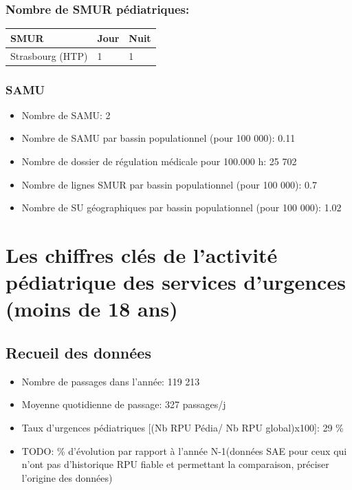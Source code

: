 \documentclass[]{article}
\begin{document}
\subsubsection{Nombre de SMUR
pédiatriques:}\label{nombre-de-smur-pediatriques}

\begin{longtable}[c]{@{}lll@{}}
\toprule
SMUR & Jour & Nuit\tabularnewline
\midrule
\endhead
Strasbourg (HTP) & 1 & 1\tabularnewline
\bottomrule
\end{longtable}

\subsubsection{SAMU}\label{samu}

\begin{itemize}
\itemsep1pt\parskip0pt
\item
  Nombre de SAMU: 2
\item
  Nombre de SAMU par bassin populationnel (pour 100 000): 0.11
\item
  Nombre de dossier de régulation médicale pour 100.000 h: 25 702
\item
  Nombre de lignes SMUR par bassin populationnel (pour 100 000): 0.7
\item
  Nombre de SU géographiques par bassin populationnel (pour 100 000):
  1.02
\end{itemize}

\section{Les chiffres clés de l'activité pédiatrique des services
d'urgences (moins de 18
ans)}\label{les-chiffres-cles-de-lactivite-pediatrique-des-services-durgences-moins-de-18-ans}

\subsection{Recueil des données}\label{recueil-des-donnees-1}

\begin{itemize}
\itemsep1pt\parskip0pt
\item
  Nombre de passages dans l'année: 119 213
\item
  Moyenne quotidienne de passage: 327 passages/j
\item
  Taux d'urgences pédiatriques {[}(Nb RPU Pédia/ Nb RPU global)x100{]}:
  29 \%
\item
  TODO: \% d'évolution par rapport à l'année N-1(données SAE pour ceux
  qui n'ont pas d'historique RPU fiable et permettant la comparaison,
  préciser l'origine des données)
\end{itemize}
\end{document}
